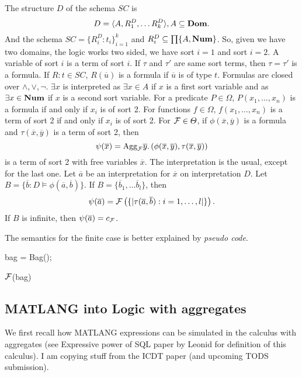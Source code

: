 The structure $D$ of the schema $SC$ is $$D=\langle A, R^D_1,\ldots R^D_k \rangle, A\subseteq \textbf{Dom}.$$ And the schema $SC=\lbrace R^D_i:t_i\rbrace_{i=1}^k$ and $R_i^D\subseteq\textstyle\prod\lbrace A,\textbf{Num}\rbrace$. So, given we have two domains, the logic works two sided, we have sort $i=1$ and sort $i=2$. A variable of sort $i$ is a term of sort $i$. If $\tau$ and $\tau'$ are same sort terms, then $\tau=\tau'$ is a formula. If $R:t\in SC$, $R(\overline{u})$ is a formula if $\overline{u}$ is of type $t$. Formulas are closed over $\wedge,\vee,\neg$. $\exists x$ is interpreted as $\exists x\in A$ if $x$ is a first sort variable and as $\exists x \in \textbf{Num}$ if $x$ is a second sort variable. For a predicate $P\in\Omega$, $P(x_1,\ldots,x_n)$ is a formula if and only if $x_i$ is of sort 2. For functions $f\in \varOmega$, $f(x_1,\ldots,x_n)$ is a term of sort 2 if and only if $x_i$ is of sort 2. For $\mathcal{F}\in\varTheta$, if $\phi (\overline{x}, \overline{y})$ is a formula and $\tau(\overline{x}, \overline{y})$ is a term of sort 2, then $$\psi(\overline{x})=\text{Agg}_{\mathcal{F}}\overline{y}.\left(\phi (\overline{x}, \overline{y}),  \tau(\overline{x}, \overline{y})\right)$$ is a term of sort 2 with free variables $\overline{x}$. The interpretation is the usual, except for the last one. Let $\overline{a}$ be an interpretation for $\overline{x}$ on interpretation $D$. Let $B=\lbrace \overline{b}:D\models \phi(\overline{a},\overline{b})\rbrace$. If $B=\lbrace\overline{b}_1,\ldots\overline{b}_l\rbrace$, then $$\psi(\overline{a})=\mathcal{F}\left(\lbrace\vert \tau(\overline{a}, \overline{b}):i=1,\ldots,l\vert\rbrace\right).$$ If $B$ is infinite, then $\psi (\overline{a})=c_{\mathcal{F}}$. 

The semantics for the finite case is better explained by \textit{pseudo code}.

\vspace{0.5cm}

\begin{algorithm}[H]
bag = Bag();




 
 \Return $\mathcal{F}$(bag)
\end{algorithm}



\subsection{MATLANG into Logic with aggregates}
We first recall how MATLANG expressions can be simulated in the calculus with aggregates (see Expressive power of SQL paper by Leonid
for definition of this calculus). I am copying stuff from the ICDT paper (and upcoming TODS submission).

